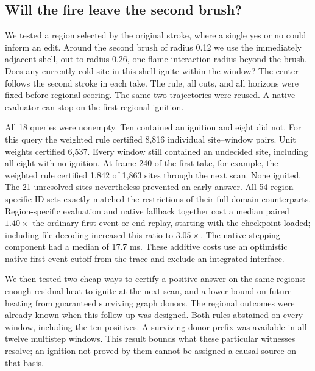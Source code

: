 \subsection{Will the fire leave the second brush?}
We tested a region selected by the original stroke, where a single yes or no could inform an edit. Around the second brush of radius 0.12 we use the immediately adjacent shell, out to radius 0.26, one flame interaction radius beyond the brush. Does any currently cold site in this shell ignite within the window? The center follows the second stroke in each take. The rule, all cuts, and all horizons were fixed before regional scoring. The same two trajectories were reused. A native evaluator can stop on the first regional ignition.

All 18 queries were nonempty. Ten contained an ignition and eight did not. For this query the weighted rule certified 8,816 individual site--window pairs. Unit weights certified 6,537. Every window still contained an undecided site, including all eight with no ignition. At frame 240 of the first take, for example, the weighted rule certified 1,842 of 1,863 sites through the next scan. None ignited. The 21 unresolved sites nevertheless prevented an early answer. All 54 region-specific ID sets exactly matched the restrictions of their full-domain counterparts. Region-specific evaluation and native fallback together cost a median paired $1.40\times$ the ordinary first-event-or-end replay, starting with the checkpoint loaded; including file decoding increased this ratio to $3.05\times$. The native stepping component had a median of 17.7 ms. These additive costs use an optimistic native first-event cutoff from the trace and exclude an integrated interface.

We then tested two cheap ways to certify a positive answer on the same regions: enough residual heat to ignite at the next scan, and a lower bound on future heating from guaranteed surviving graph donors. The regional outcomes were already known when this follow-up was designed. Both rules abstained on every window, including the ten positives. A surviving donor prefix was available in all twelve multistep windows. This result bounds what these particular witnesses resolve; an ignition not proved by them cannot be assigned a causal source on that basis.

\balance
